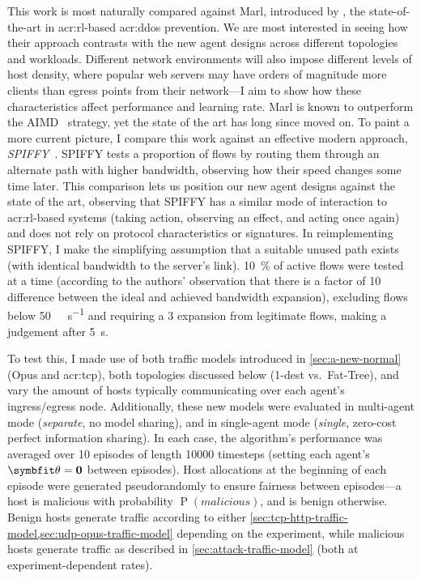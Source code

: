 
This work is most naturally compared against Marl, introduced by \textcite{DBLP:journals/eaai/MalialisK15}, the state-of-the-art in \gls{acr:rl}-based \gls{acr:ddos} prevention.
We are most interested in seeing how their approach contrasts with the new agent designs across different topologies and workloads.
Different network environments will also impose different levels of host density, where popular web servers may have orders of magnitude more clients than egress points from their network---I aim to show how these characteristics affect performance and learning rate.
Marl is known to outperform the AIMD~\parencite{DBLP:journals/ton/YauLLY05} strategy, yet the state of the art has long since moved on.
To paint a more current picture, I compare this work against an effective modern approach, \emph{SPIFFY}~\parencite{DBLP:conf/ndss/KangGS16}.
SPIFFY tests a proportion of flows by routing them through an alternate path with higher bandwidth, observing how their speed changes some time later.
This comparison lets us position our new agent designs against the state of the art, observing that SPIFFY has a similar mode of interaction to \gls{acr:rl}-based systems (taking action, observing an effect, and acting once again) and does not rely on protocol characteristics or signatures.
In reimplementing SPIFFY, I make the simplifying assumption that a suitable unused path exists (with identical bandwidth to the server's link).
\qty{10}{\percent} of active flows were tested at a time (according to the authors' observation that there is a factor of \qty{10}{\times} difference between the ideal and achieved bandwidth expansion), excluding flows below \qty{50}{\kilo\bit\per\second} and requiring a \qty{3}{\times} expansion from legitimate flows, making a judgement after \qty{5}{\second}.

To test this, I made use of both traffic models introduced in \cref{sec:a-new-normal} (Opus and \gls{acr:tcp}), both topologies discussed below (1-dest vs.\ Fat-Tree), and vary the amount of hosts typically communicating over each agent's ingress/egress node.
Additionally, these new models were evaluated in multi-agent mode (\emph{separate}, no model sharing), and in single-agent mode (\emph{single}, zero-cost perfect information sharing).
In each case, the algorithm's performance was averaged over \num{10} episodes of length \num{10000} timesteps (setting each agent's $\wvec{}=\mathbf{0}$ between episodes).
Host allocations at the beginning of each episode were generated pseudorandomly to ensure fairness between episodes---a host is malicious with probability $\operatorname{P}\left(\mathit{malicious}\right)$, and is benign otherwise.
Benign hosts generate traffic according to either \cref{sec:tcp-http-traffic-model,sec:udp-opus-traffic-model} depending on the experiment, while malicious hosts generate traffic as described in \cref{sec:attack-traffic-model} (both at experiment-dependent rates).

